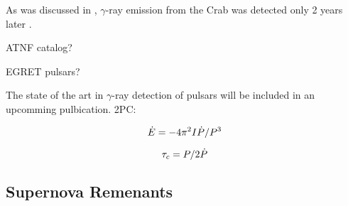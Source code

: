 As was discussed in ,
$\gamma$-ray emission from the Crab was detected only 2 years
later \citep{browning_1971_detection-pulsed}.


ATNF catalog?

EGRET pulsars?

The state of the art in $\gamma$-ray detection of pulsars
will be included in an upcomming pulbication.
2PC: 


\begin{equation}
  \dot{E} = 
  -4\pi^2 I \dot{P}/P^3
\end{equation}

\begin{equation}
  \tau_c = P/2\dot{P}
\end{equation}



\subsection{Supernova Remenants}

